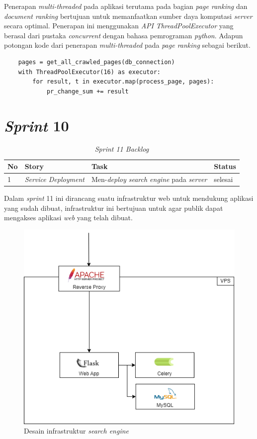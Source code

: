 Penerapan \textit{multi-threaded} pada aplikasi terutama pada bagian \textit{page ranking} dan \textit{document ranking} bertujuan untuk memanfaatkan sumber daya komputasi \textit{server} secara optimal. Penerapan ini menggunakan \textit{API} \textit{ThreadPoolExecutor} yang berasal dari pustaka \textit{concurrent} dengan bahasa pemrograman \textit{python}. Adapun potongan kode dari penerapan \textit{multi-threaded} pada \textit{page ranking} sebagai berikut.

\begin{lstlisting}
	pages = get_all_crawled_pages(db_connection)
	with ThreadPoolExecutor(16) as executor:
		for result, t in executor.map(process_page, pages):                
			pr_change_sum += result
\end{lstlisting}

\section{\textit{Sprint} 10}

\begin{longtable}{@{}|p{0.5cm}|p{4cm}|p{6cm}|p{2cm}|@{}}
	\caption{\textit{Sprint 11 Backlog}}\\	
	\hline
	\textbf{No} & \textbf{Story} & \textbf{Task} & \textbf{Status} \\
	\hline
	1 & \textit{Service Deployment} & Men-\textit{deploy search engine} pada \textit{server} & selesai \\
	\cline{3-4}
	\hline
	
\end{longtable}

Dalam \textit{sprint} 11 ini dirancang suatu infrastruktur web untuk mendukung aplikasi yang sudah dibuat, infrastruktur ini bertujuan untuk agar publik dapat mengakses aplikasi \textit{web} yang telah dibuat.

\begin{figure}[H]
	\centering
	\includegraphics[keepaspectratio, width=13cm]{gambar/infra.png}
	\caption{Desain infrastruktur \textit{search engine}}
	\label{gambar:infra.png}
\end{figure}

